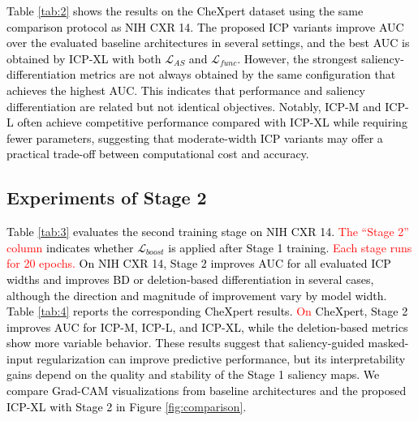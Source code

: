 \documentclass[preprint,7pt, a4paper]{elsarticle}
\begin{document}
\textcolor{black}{Table \ref{tab:2} shows the results on the CheXpert dataset using the same comparison protocol as NIH CXR 14. The proposed ICP variants improve AUC over the evaluated baseline architectures in several settings, and the best AUC is obtained by ICP-XL with both $\mathcal{L}_{AS}$ and $\mathcal{L}_{func}$. However, the strongest saliency-differentiation metrics are not always obtained by the same configuration that achieves the highest AUC. This indicates that performance and saliency differentiation are related but not identical objectives. Notably, ICP-M and ICP-L often achieve competitive performance compared with ICP-XL while requiring fewer parameters, suggesting that moderate-width ICP variants may offer a practical trade-off between computational cost and accuracy.}

\subsection{Experiments of Stage 2}

\textcolor{black}{Table \ref{tab:3} evaluates the second training stage on NIH CXR 14. \textcolor{red}{The ``Stage 2'' column} indicates whether $\mathcal{L}_{boost}$ is applied after Stage 1 training. \textcolor{red}{Each stage runs for 20 epochs.} On NIH CXR 14, Stage 2 improves AUC for all evaluated ICP widths and improves BD or deletion-based differentiation in several cases, although the direction and magnitude of improvement vary by model width. Table \ref{tab:4} reports the corresponding CheXpert results. \textcolor{red}{On} CheXpert, Stage 2 improves AUC for ICP-M, ICP-L, and ICP-XL, while the deletion-based metrics show more variable behavior. These results suggest that saliency-guided masked-input regularization can improve predictive performance, but its interpretability gains depend on the quality and stability of the Stage 1 saliency maps. We compare Grad-CAM visualizations from baseline architectures and the proposed ICP-XL with Stage 2 in Figure \ref{fig:comparison}.}
\end{document}
